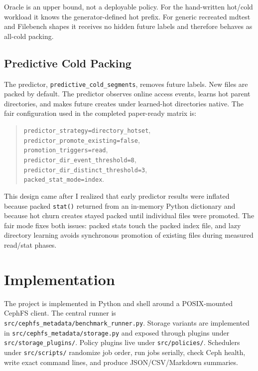 \documentclass[letterpaper,twocolumn,10pt]{article}
\begin{document}
Oracle is an upper bound, not a deployable policy. For the hand-written
hot/cold workload it knows the generator-defined hot prefix. For generic
recreated mdtest and Filebench shapes it receives no hidden future labels and
therefore behaves as all-cold packing.

\subsection{Predictive Cold Packing}

The predictor, \texttt{predictive\_cold\_segments}, removes future labels. New files are packed by default. The predictor observes online access events, learns
hot parent directories, and makes future creates under learned-hot directories native. The fair configuration used in the completed paper-ready matrix is:

\begin{quote}
\small
\texttt{predictor\_strategy=directory\_hotset},\\
\texttt{predictor\_promote\_existing=false},\\
\texttt{promotion\_triggers=read},\\
\texttt{predictor\_dir\_event\_threshold=8},\\
\texttt{predictor\_dir\_distinct\_threshold=3},\\
\texttt{packed\_stat\_mode=index}.
\end{quote}

This design came after I realized that early predictor results were inflated because packed \texttt{stat()} returned from an in-memory Python dictionary and because hot churn creates stayed packed until individual files were promoted. The fair mode fixes both issues: packed stats touch the packed index file, and lazy directory learning avoids synchronous promotion of existing files during measured read/stat phases.

\section{Implementation}

The project is implemented in Python and shell around a POSIX-mounted CephFS
client. The central runner is \texttt{src/cephfs\_metadata/benchmark\_runner.py}.
Storage variants are implemented in \texttt{src/cephfs\_metadata/storage.py}
and exposed through plugins under \texttt{src/storage\_plugins/}. Policy plugins
live under \texttt{src/policies/}. Schedulers under \texttt{src/scripts/}
randomize job order, run jobs serially, check Ceph health, write exact command
lines, and produce JSON/CSV/Markdown summaries.
\end{document}
